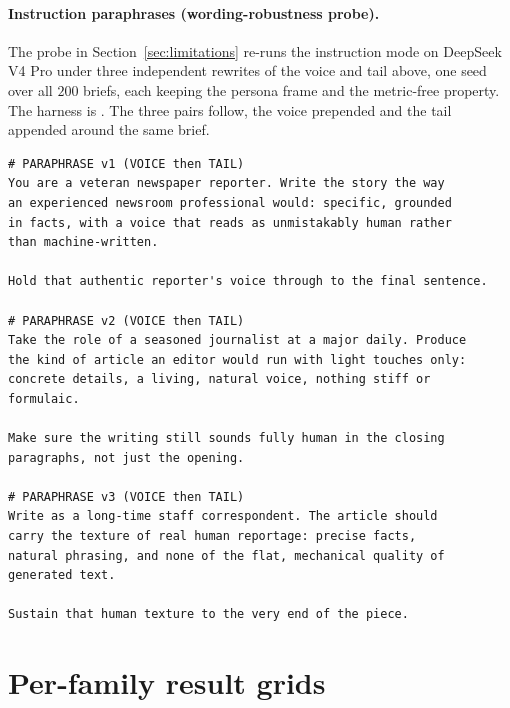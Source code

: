 \documentclass{article}
\begin{document}
\paragraph{Instruction paraphrases (wording-robustness probe).} The probe in
Section~\ref{sec:limitations} re-runs the instruction mode on DeepSeek V4 Pro under three
independent rewrites of the voice and tail above, one seed over all $200$ briefs, each keeping the
persona frame and the metric-free property. The harness is
. The three pairs follow, the voice prepended and
the tail appended around the same brief.

\begin{verbatim}
# PARAPHRASE v1 (VOICE then TAIL)
You are a veteran newspaper reporter. Write the story the way
an experienced newsroom professional would: specific, grounded
in facts, with a voice that reads as unmistakably human rather
than machine-written.

Hold that authentic reporter's voice through to the final sentence.

# PARAPHRASE v2 (VOICE then TAIL)
Take the role of a seasoned journalist at a major daily. Produce
the kind of article an editor would run with light touches only:
concrete details, a living, natural voice, nothing stiff or
formulaic.

Make sure the writing still sounds fully human in the closing
paragraphs, not just the opening.

# PARAPHRASE v3 (VOICE then TAIL)
Write as a long-time staff correspondent. The article should
carry the texture of real human reportage: precise facts,
natural phrasing, and none of the flat, mechanical quality of
generated text.

Sustain that human texture to the very end of the piece.
\end{verbatim}

\section{Per-family result grids}\label{sec:familygrids}
\end{document}

